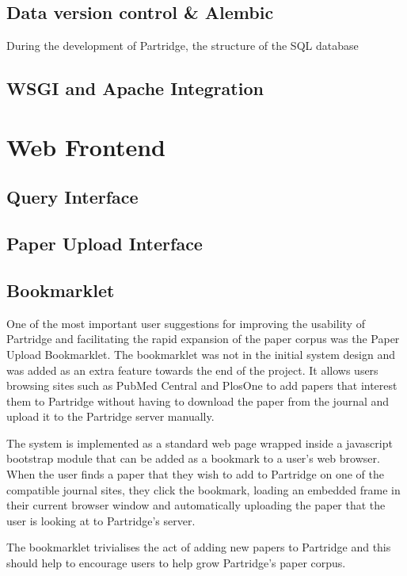 \subsection{Data version control \& Alembic}

During the development of Partridge, the structure of the SQL database

\subsection{WSGI and Apache Integration}


\section{Web Frontend}

\subsection{Query Interface}

\subsection{ Paper Upload Interface }

\subsection{ Bookmarklet }

One of the most important user suggestions for improving the usability of
Partridge and facilitating the rapid expansion of the paper corpus was the
Paper Upload Bookmarklet. The bookmarklet was not in the initial system design
and was added as an extra feature towards the end of the project. It allows
users browsing sites such as PubMed Central and PlosOne to add papers that
interest them to Partridge without having to download the paper from the
journal and upload it to the Partridge server manually. 

The system is implemented as a standard web page wrapped inside a javascript
bootstrap module that can be added as a bookmark to a user's web browser. When
the user finds a paper that they wish to add to Partridge on one of the
compatible journal sites, they click the bookmark, loading an embedded frame in
their current browser window and automatically uploading the paper that the
user is looking at to Partridge's server. 

The bookmarklet trivialises the act of adding new papers to Partridge and this
should help to encourage users to help grow Partridge's paper corpus. 
